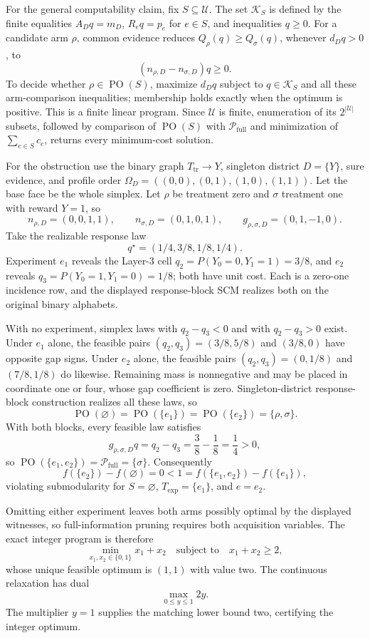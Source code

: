For the general computability claim, fix \(S\subseteq\mathcal U\).  The set \(\mathcal K_S\) is defined by the finite equalities \(A_Dq=m_D\), \(R_eq=p_e\) for \(e\in S\), and inequalities \(q\geq0\).  For a candidate arm \(\rho\), common evidence reduces \(Q_\rho(q)\geq Q_\sigma(q)\), whenever \(d_Dq>0\), to
\[
(n_{\rho,D}-n_{\sigma,D})q\geq0.
\]
To decide whether \(\rho\in\operatorname{PO}(S)\), maximize \(d_Dq\) subject to \(q\in\mathcal K_S\) and all these arm-comparison inequalities; membership holds exactly when the optimum is positive.  This is a finite linear program.  Since \(\mathcal U\) is finite, enumeration of its \(2^{|\mathcal U|}\) subsets, followed by comparison of \(\operatorname{PO}(S)\) with \(\mathcal P_{\mathrm{full}}\) and minimization of \(\sum_{e\in S}c_e\), returns every minimum-cost solution.

For the obstruction use the binary graph \(T_{\mathrm{tr}}\to Y\), singleton district \(D=\{Y\}\), sure evidence, and profile order
\(
\Omega_D=((0,0),(0,1),(1,0),(1,1))
\).
Let the base face be the whole simplex.  Let \(\rho\) be treatment zero and \(\sigma\) treatment one with reward \(Y=1\), so
\[
n_{\rho,D}=(0,0,1,1),
\qquad n_{\sigma,D}=(0,1,0,1),
\qquad g_{\rho,\sigma,D}=(0,1,-1,0).
\]
Take the realizable response law
\[
q^\star=(1/4,3/8,1/8,1/4).
\]
Experiment \(e_1\) reveals the Layer-3 cell \(q_2=P(Y_0=0,Y_1=1)=3/8\), and \(e_2\) reveals \(q_3=P(Y_0=1,Y_1=0)=1/8\); both have unit cost.  Each is a zero-one incidence row, and the displayed response-block SCM realizes both on the original binary alphabets.

With no experiment, simplex laws with \(q_2-q_3<0\) and with \(q_2-q_3>0\) exist.  Under \(e_1\) alone, the feasible pairs \((q_2,q_3)=(3/8,5/8)\) and \((3/8,0)\) have opposite gap signs.  Under \(e_2\) alone, the feasible pairs \((q_2,q_3)=(0,1/8)\) and \((7/8,1/8)\) do likewise.  Remaining mass is nonnegative and may be placed in coordinate one or four, whose gap coefficient is zero.  Singleton-district response-block construction realizes all these laws, so
\[
\operatorname{PO}(\varnothing)=\operatorname{PO}(\{e_1\})
=\operatorname{PO}(\{e_2\})=\{\rho,\sigma\}.
\]
With both blocks, every feasible law satisfies
\[
g_{\rho,\sigma,D}q=q_2-q_3=\frac38-\frac18=\frac14>0,
\]
so \(\operatorname{PO}(\{e_1,e_2\})=\mathcal P_{\mathrm{full}}=\{\sigma\}\).  Consequently
\[
f(\{e_2\})-f(\varnothing)=0
<1=f(\{e_1,e_2\})-f(\{e_1\}),
\]
violating submodularity for \(S=\varnothing\), \(T_{\mathrm{exp}}=\{e_1\}\), and \(e=e_2\).

Omitting either experiment leaves both arms possibly optimal by the displayed witnesses, so full-information pruning requires both acquisition variables.  The exact integer program is therefore
\[
\min_{x_1,x_2\in\{0,1\}}x_1+x_2
\quad\text{subject to}\quad x_1+x_2\geq2,
\]
whose unique feasible optimum is \((1,1)\) with value two.  The continuous relaxation has dual
\[
\max_{0\leq y\leq1}2y.
\]
The multiplier \(y=1\) supplies the matching lower bound two, certifying the integer optimum.